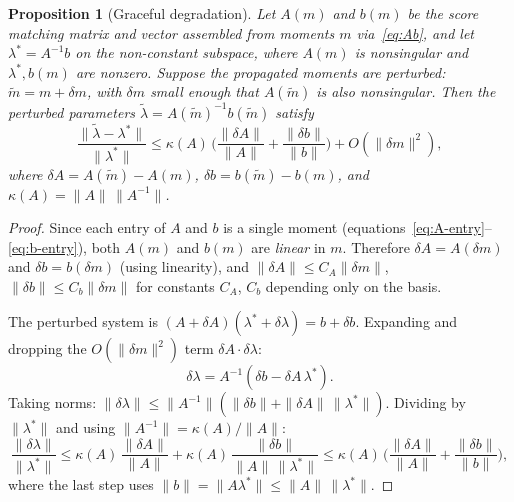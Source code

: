 \documentclass{article}
\newtheorem{proposition}{Proposition}
\theoremstyle{definition}
\begin{document}
\begin{proposition}[Graceful degradation]\label{prop:graceful}
Let $A(m)$ and $b(m)$ be the score matching matrix and vector
assembled from moments $m$ via~\eqref{eq:Ab},
and let $\lambda^* = A^{-1}b$ on the non-constant subspace, where
$A(m)$ is nonsingular and $\lambda^*, b(m)$ are nonzero.
Suppose the propagated moments are perturbed:
$\tilde{m} = m + \delta m$, with $\delta m$ small enough that
$A(\tilde m)$ is also nonsingular.
Then the perturbed parameters $\tilde{\lambda} = A(\tilde{m})^{-1} b(\tilde{m})$
satisfy
\begin{equation}
    \frac{\|\tilde\lambda - \lambda^*\|}{\|\lambda^*\|}
    \le \kappa(A)\,
    \biggl(\frac{\|\delta A\|}{\|A\|} + \frac{\|\delta b\|}{\|b\|}\biggr)
    + O(\|\delta m\|^2),
\end{equation}
where $\delta A = A(\tilde{m}) - A(m)$,
$\delta b = b(\tilde{m}) - b(m)$,
and $\kappa(A) = \|A\|\,\|A^{-1}\|$.
\end{proposition}

\begin{proof}
Since each entry of $A$ and $b$ is a single moment
(equations~\eqref{eq:A-entry}--\eqref{eq:b-entry}),
both $A(m)$ and $b(m)$ are \emph{linear} in $m$.
Therefore $\delta A = A(\delta m)$ and $\delta b = b(\delta m)$
(using linearity), and
$\|\delta A\| \le C_A \|\delta m\|$,
$\|\delta b\| \le C_b \|\delta m\|$
for constants $C_A$, $C_b$ depending only on the basis.

The perturbed system is $(A + \delta A)(\lambda^* + \delta\lambda) = b + \delta b$.
Expanding and dropping the $O(\|\delta m\|^2)$ term $\delta A \cdot \delta\lambda$:
\begin{equation}
    \delta\lambda = A^{-1}(\delta b - \delta A\, \lambda^*).
\end{equation}
Taking norms:
$\|\delta\lambda\| \le \|A^{-1}\|(\|\delta b\| + \|\delta A\|\,\|\lambda^*\|)$.
Dividing by $\|\lambda^*\|$ and using $\|A^{-1}\| = \kappa(A)/\|A\|$:
\begin{equation}
    \frac{\|\delta\lambda\|}{\|\lambda^*\|}
    \le \kappa(A)\,\frac{\|\delta A\|}{\|A\|}
    + \kappa(A)\,\frac{\|\delta b\|}{\|A\|\,\|\lambda^*\|}
    \le \kappa(A)\,
    \biggl(\frac{\|\delta A\|}{\|A\|} + \frac{\|\delta b\|}{\|b\|}\biggr),
\end{equation}
where the last step uses $\|b\| = \|A\lambda^*\| \le \|A\|\,\|\lambda^*\|$.
\end{proof}
\end{document}
